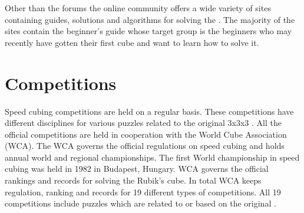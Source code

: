 Other than the forums the online community offers a wide variety of sites containing guides, solutions and algorithms for solving the \rubik{}. The majority of the \rubik{} sites contain the beginner's guide\cite{jasminLee08} whose target group is the beginners who may recently have gotten their first cube and want to learn how to solve it. 

\section{Competitions}
\label{sec:wca}
Speed cubing competitions are held on a regular basis\cite{wca/competitions}. These competitions have different disciplines for various puzzles related to the original 3x3x3 \rubik{}. All the official competitions are held in cooperation with the World Cube Association (WCA). The WCA governs the official regulations on speed cubing and holds annual world and regional championships. The first World championship in speed cubing was held in 1982 in Budapest, Hungary. WCA governs the official rankings and records for solving the Rubik's cube. In total WCA keeps regulation, ranking and records for 19 different types of competitions. All 19 competitions include puzzles which are related to or based on the original \rubik{}. 
%